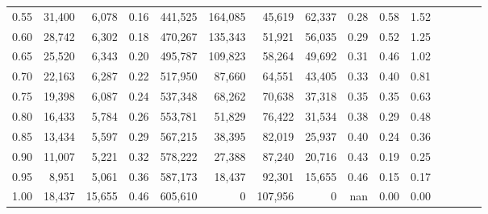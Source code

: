 \begin{tabular}{rrrcrrrrrrrrrrr}
0.55 &  31,400 &   6,078 &                                       0.16 &  441,525 &  164,085 &   45,619 &   62,337 &  0.28 &  0.58 &                         1.52 \\
0.60 &  28,742 &   6,302 &                                       0.18 &  470,267 &  135,343 &   51,921 &   56,035 &  0.29 &  0.52 &                         1.25 \\
0.65 &  25,520 &   6,343 &                                       0.20 &  495,787 &  109,823 &   58,264 &   49,692 &  0.31 &  0.46 &                         1.02 \\
0.70 &  22,163 &   6,287 &                                       0.22 &  517,950 &   87,660 &   64,551 &   43,405 &  0.33 &  0.40 &                         0.81 \\
0.75 &  19,398 &   6,087 &                                       0.24 &  537,348 &   68,262 &   70,638 &   37,318 &  0.35 &  0.35 &                         0.63 \\
0.80 &  16,433 &   5,784 &                                       0.26 &  553,781 &   51,829 &   76,422 &   31,534 &  0.38 &  0.29 &                         0.48 \\
0.85 &  13,434 &   5,597 &                                       0.29 &  567,215 &   38,395 &   82,019 &   25,937 &  0.40 &  0.24 &                         0.36 \\
0.90 &  11,007 &   5,221 &                                       0.32 &  578,222 &   27,388 &   87,240 &   20,716 &  0.43 &  0.19 &                         0.25 \\
0.95 &   8,951 &   5,061 &                                       0.36 &  587,173 &   18,437 &   92,301 &   15,655 &  0.46 &  0.15 &                         0.17 \\
1.00 &  18,437 &  15,655 &                                       0.46 &  605,610 &        0 &  107,956 &        0 &   nan &  0.00 &                         0.00 \\
\bottomrule
\end{tabular}
